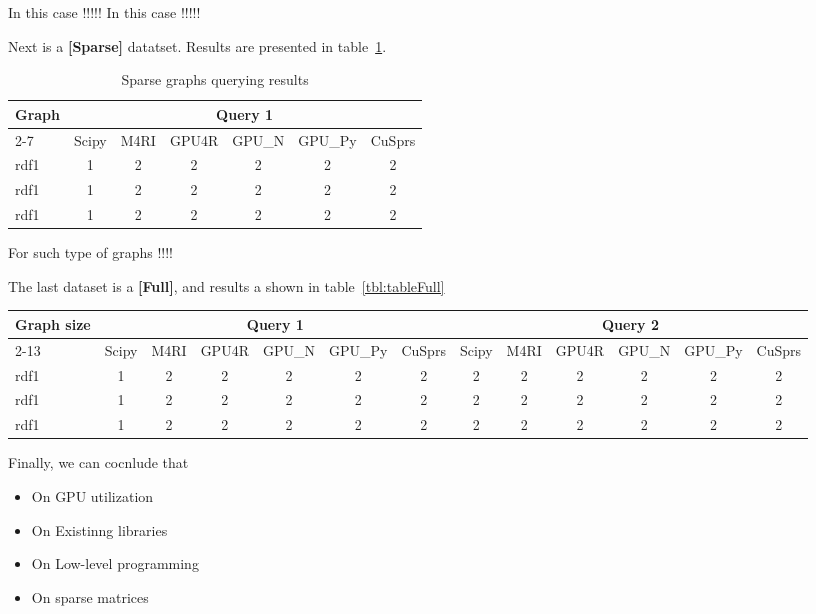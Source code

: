 In this case !!!!!
In this case !!!!!

Next is a \textbf{[Sparse]} datatset. 
Results are presented in table~\ref{tbl:tableSparse}.

\begin{table}
\caption{Sparse graphs querying results}
\label{tbl:tableSparse}
\begin{tabular}{| l | c | c | c | c | c | c | }
    \hline
    \multirow{2}{*}{Graph} & \multicolumn{6}{|c|}{Query 1} \\ 
    \cline{2-7}
                         & Scipy & M4RI & GPU4R & GPU\_N & GPU\_Py & CuSprs  \\
    \hline
    \hline
    rdf1 & 1 & 2 & 2& 2& 2& 2 \\ 
    rdf1 & 1 & 2 & 2& 2& 2& 2 \\ 
    rdf1 & 1 & 2 & 2& 2& 2& 2 \\ 
    \hline
  \end{tabular}
\end{table}


For such type of graphs !!!!

The last dataset is a \textbf{[Full]}, and results a shown in table~\ref{tbl:tableFull}


\begin{table*}
\caption{Full querying results}
\label{tbl:tableFull}
\begin{tabular}{| l | c | c | c | c | c | c | c | c | c | c | c | c |}
    \hline
    \multirow{2}{*}{Graph size} & \multicolumn{6}{|c|}{Query 1}                               & \multicolumn{6}{|c|}{Query 2} \\ 
    \cline{2-13}
                         & Scipy & M4RI & GPU4R & GPU\_N & GPU\_Py & CuSprs & Scipy & M4RI & GPU4R & GPU\_N & GPU\_Py & CuSprs \\
    \hline
    \hline
    rdf1 & 1 & 2 & 2& 2& 2& 2& 2& 2& 2& 2& 2& 2\\ 
    rdf1 & 1 & 2 & 2& 2& 2& 2& 2& 2& 2& 2& 2& 2\\ 
    rdf1 & 1 & 2 & 2& 2& 2& 2& 2& 2& 2& 2& 2& 2\\ 
    \hline
  \end{tabular}
\end{table*}


Finally, we can cocnlude that
\begin{itemize}
\item On GPU utilization
\item On Existinng libraries
\item On Low-level programming
\item On sparse matrices
\end{itemize}
